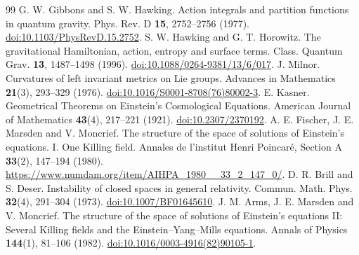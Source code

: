 \documentclass[11pt,a4paper]{article}
\begin{document}
\begin{thebibliography}{99}
 G. W. Gibbons and S. W. Hawking. Action integrals and partition functions in quantum gravity. Phys. Rev. D \textbf{15}, 2752--2756 (1977). \href{https://doi.org/10.1103/PhysRevD.15.2752}{doi:10.1103/PhysRevD.15.2752}.
 S. W. Hawking and G. T. Horowitz. The gravitational Hamiltonian, action, entropy and surface terms. Class. Quantum Grav. \textbf{13}, 1487--1498 (1996). \href{https://doi.org/10.1088/0264-9381/13/6/017}{doi:10.1088/0264-9381/13/6/017}.
 J. Milnor. Curvatures of left invariant metrics on Lie groups. Advances in Mathematics \textbf{21}(3), 293--329 (1976). \href{https://doi.org/10.1016/S0001-8708(76)80002-3}{doi:10.1016/S0001-8708(76)80002-3}.
 E. Kasner. Geometrical Theorems on Einstein's Cosmological Equations. American Journal of Mathematics \textbf{43}(4), 217--221 (1921). \href{https://doi.org/10.2307/2370192}{doi:10.2307/2370192}.
 A. E. Fischer, J. E. Marsden and V. Moncrief. The structure of the space of solutions of Einstein's equations. I. One Killing field. Annales de l'institut Henri Poincar\'e, Section A \textbf{33}(2), 147--194 (1980). \url{https://www.numdam.org/item/AIHPA_1980__33_2_147_0/}.
 D. R. Brill and S. Deser. Instability of closed spaces in general relativity. Commun. Math. Phys. \textbf{32}(4), 291--304 (1973). \href{https://doi.org/10.1007/BF01645610}{doi:10.1007/BF01645610}.
 J. M. Arms, J. E. Marsden and V. Moncrief. The structure of the space of solutions of Einstein's equations II: Several Killing fields and the Einstein--Yang--Mills equations. Annals of Physics \textbf{144}(1), 81--106 (1982). \href{https://doi.org/10.1016/0003-4916(82)90105-1}{doi:10.1016/0003-4916(82)90105-1}.
\end{thebibliography}
\end{document}
